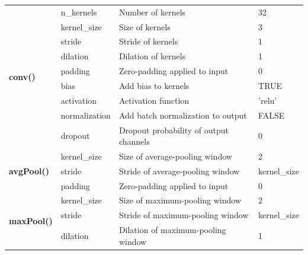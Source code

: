 \documentclass[12pt,twoside]{scrreport}
\begin{document}
\begin{table}[t]
{\begin{tabular}{|llll|}
			\multirow{9}{*}{\textbf{conv()}}     & n\_kernels    & Number of kernels                                                                                                  & 32        \\
			& kernel\_size  & Size of kernels                                                                           & 3         \\
			& stride        & Stride of kernels                                                                     & 1         \\
			& dilation      & Dilation of kernels                                                                 & 1         \\
			& padding       & Zero-padding applied to input                                        & 0         \\
			& bias          & Add bias to kernels                                                              & TRUE      \\
			& activation    & Activation function                                         & 'relu'    \\
			& normalization & Add batch normalization to output                                                      & FALSE     \\
			& dropout       & Dropout probability of output channels                          & 0         \\ \hline
			\multirow{3}{*}{\textbf{avgPool()}}  & kernel\_size  & Size of average-pooling window                                                                                                    & 2         \\
			& stride        & Stride of average-pooling window                                                                                                  & kernel\_size         \\
			& padding       & Zero-padding applied to input                                     & 0         \\ \hline
			\multirow{4}{*}{\textbf{maxPool()}}  & kernel\_size  & Size of maximum-pooling window                                                                                                    & 2         \\
			& stride        & Stride of maximum-pooling window                                                                                                  & kernel\_size         \\
			& dilation      & Dilation of maximum-pooling window                                                                                                & 1         \\

\end{tabular}}
\end{table}
\end{document}
